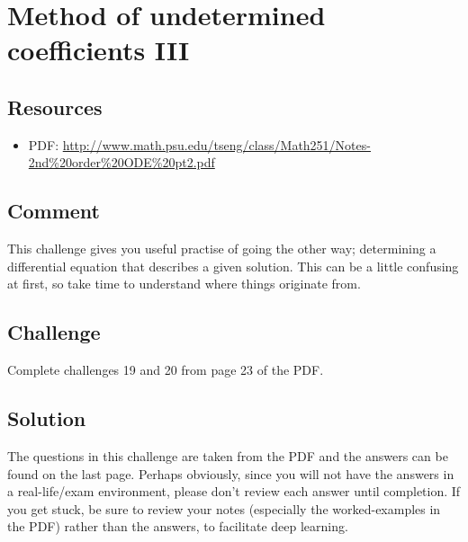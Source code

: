 \newpage
\section{Method of undetermined coefficients III}

\subsection*{Resources}
\begin{itemize}
    \item PDF: \url{http://www.math.psu.edu/tseng/class/Math251/Notes-2nd\%20order\%20ODE\%20pt2.pdf}
\end{itemize}

\subsection*{Comment}
This challenge gives you useful practise of going the other way; determining a differential equation that describes a given solution. This can be a little confusing at first, so take time to understand where things originate from.

\subsection*{Challenge}
Complete challenges 19 and 20 from page 23 of the PDF.

\subsection*{Solution}
The questions in this challenge are taken from the PDF and the answers can be found on the last page. Perhaps obviously, since you will not have the answers in a real-life/exam environment, please don't review each answer until completion. If you get stuck, be sure to review your notes (especially the worked-examples in the PDF) rather than the answers, to facilitate deep learning. 


